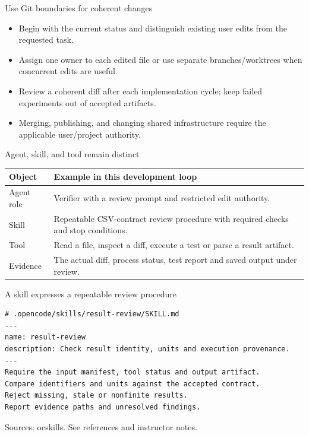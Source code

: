 \documentclass[aspectratio=169,11pt]{beamer}
\begin{document}
\begin{frame}[t,fragile]{Use Git boundaries for coherent changes}
\fontsize{11.5}{14}\selectfont
\begin{itemize}\setlength{\itemsep}{2mm}
\item Begin with the current status and distinguish existing user edits from the requested task.
\item Assign one owner to each edited file or use separate branches/worktrees when concurrent edits are useful.
\item Review a coherent diff after each implementation cycle; keep failed experiments out of accepted artifacts.
\item Merging, publishing, and changing shared infrastructure require the applicable user/project authority.
\end{itemize}
\end{frame}
\begin{frame}[t,fragile]{Agent, skill, and tool remain distinct}
\fontsize{10.5}{12.5}\selectfont\setlength{\tabcolsep}{4pt}\renewcommand{\arraystretch}{1.15}
\begin{tabular}{>{\raggedright\arraybackslash}p{}>{\raggedright\arraybackslash}p{}}
\toprule
\textbf{Object} & \textbf{Example in this development loop} \\ \midrule
Agent role & Verifier with a review prompt and restricted edit authority. \\[2pt]
Skill & Repeatable CSV-contract review procedure with required checks and stop conditions. \\[2pt]
Tool & Read a file, inspect a diff, execute a test or parse a result artifact. \\[2pt]
Evidence & The actual diff, process status, test report and saved output under review. \\[2pt]
\bottomrule\end{tabular}\par\vspace{2mm}
\end{frame}
\begin{frame}[t,fragile]{A skill expresses a repeatable review procedure}
\begin{lstlisting}
# .opencode/skills/result-review/SKILL.md
---
name: result-review
description: Check result identity, units and execution provenance.
---
Require the input manifest, tool status and output artifact.
Compare identifiers and units against the accepted contract.
Reject missing, stale or nonfinite results.
Report evidence paths and unresolved findings.
\end{lstlisting}
\vfill{\fontsize{6.5}{8}\selectfont\color{UTgray} Sources: ocskills. See references and instructor notes.\par}
\end{frame}
\end{document}
